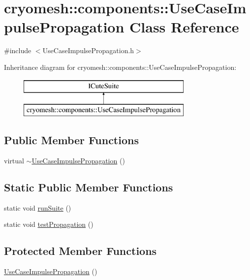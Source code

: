 \hypertarget{classcryomesh_1_1components_1_1_use_case_impulse_propagation}{
\section{cryomesh::components::UseCaseImpulsePropagation Class Reference}
\label{classcryomesh_1_1components_1_1_use_case_impulse_propagation}
}


{\ttfamily \#include $<$UseCaseImpulsePropagation.h$>$}

Inheritance diagram for cryomesh::components::UseCaseImpulsePropagation:\begin{figure}[H]
\begin{center}
\leavevmode
\includegraphics[height=2.000000cm]{classcryomesh_1_1components_1_1_use_case_impulse_propagation}
\end{center}
\end{figure}
\subsection*{Public Member Functions}
\begin{DoxyCompactItemize}
\item 
virtual \hyperlink{classcryomesh_1_1components_1_1_use_case_impulse_propagation_a8cdcc2f6e0fc9af7711972a75e2fe006}{$\sim$UseCaseImpulsePropagation} ()
\end{DoxyCompactItemize}
\subsection*{Static Public Member Functions}
\begin{DoxyCompactItemize}
\item 
static void \hyperlink{classcryomesh_1_1components_1_1_use_case_impulse_propagation_ad978f981b7f2164efb58f96b640c3faa}{runSuite} ()
\item 
static void \hyperlink{classcryomesh_1_1components_1_1_use_case_impulse_propagation_aa6101422117b1b83ce04fe087a669ff2}{testPropagation} ()
\end{DoxyCompactItemize}
\subsection*{Protected Member Functions}
\begin{DoxyCompactItemize}
\item 
\hyperlink{classcryomesh_1_1components_1_1_use_case_impulse_propagation_abe368a0fe2b1f9f51c5d1ad15815279e}{UseCaseImpulsePropagation} ()
\end{DoxyCompactItemize}


